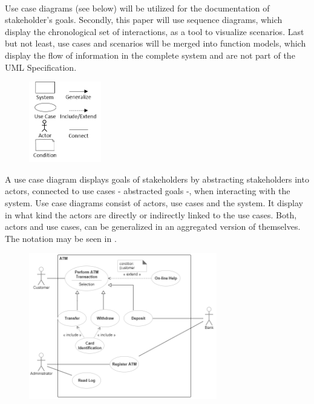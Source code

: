 \paragraph{}
Use case diagrams (see below) will be utilized for the documentation of stakeholder's goals. Secondly, this paper will use sequence diagrams, which display the chronological set of interactions, as a tool to visualize scenarios. Last but not least, use cases and scenarios will be merged into function models, which display the flow of information in the complete system and are not part of the UML Specification. 

\begin{figure}[H] 
    \centering
    \includegraphics[width=0.28\textwidth]{img/ucSymb.png}
    \label{fig:ucSymb}
\end{figure}

A use case diagram displays goals of stakeholders by abstracting stakeholders into actors, connected to use cases - abstracted goals -, when interacting with the system. Use case diagrams consist of actors, use cases and the system. It display in what kind the actors are directly or indirectly linked to the use cases. Both, actors and use cases, can be generalized in an aggregated version of themselves. The notation may be seen in .

\begin{figure}[H]
    \centering
    \includegraphics[width=0.73\textwidth]{img/ucEx.png}
    \label{fig:ucEx}
\end{figure}

